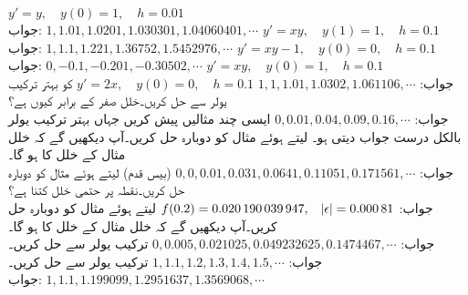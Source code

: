 \quad
$y'=y,\quad y(0)=1,\quad h=0.01$\\
جواب:\quad
$1,1.01,1.0201,1.030301,1.04060401,\cdots$
\quad
$y'=xy,\quad y(1)=1,\quad h=0.1$\\
جواب:\quad
$1,1.1,1.221,1.36752,1.5452976,\cdots$
\quad
$y'=xy-1,\quad y(0)=0,\quad h=0.1$\\
جواب:\quad
$0,-0.1,-0.201,-0.30502,\cdots$
\quad
$y'=xy,\quad y(0)=1,\quad h=0.1$\\
جواب:\quad
$1,1,1.01,1.0302,1.061106,\cdots$
\quad
$y'=2x,\quad y(0)=0,\quad h=0.1$
کو بہتر ترکیب یولر سے حل کریں۔خلل صفر کے برابر کیوں ہے؟\\
جواب:\quad
$0,0.01,0.04,0.09,0.16,\cdots$
\quad
ایسی چند مثالیں پیش کریں جہاں بہتر ترکیب یولر بالکل درست جواب دیتی ہو۔
\quad
{} لیتے ہوئے مثال  کو دوبارہ حل کریں۔آپ دیکھیں گے کہ خلل مثال  کے خلل کا  ہو گا۔\\
جواب:\quad
$0,0,0.01,0.031,0.0641,0.11051,0.171561,\cdots$
\quad
{} (بیس قدم) لیتے ہوئے مثال  کو دوبارہ حل کریں۔نقطہ  پر حتمی خلل کتنا ہے؟\\
جواب:\quad
$f(0.2)=\num{0.020190039947}, \quad \abs{\epsilon}=\num{0.00081}$
\quad
{} لیتے ہوئے مثال  کو دوبارہ حل کریں۔آپ دیکھیں گے کہ خلل  مثال  کے خلل کا  ہو گا۔\\
جواب:\quad
$0,\num{0.005},\num{0.021025},\num{0.049232625},\num{0.1474467},\cdots$
\quad
ترکیب یولر سے  حل کریں۔\\
جواب:\quad
$1,1.1,1.2,1.3,1.4,1.5,\cdots$
\quad
ترکیب یولر سے  حل کریں۔\\
جواب:\quad
$1,1.1,1.199099,1.2951637,1.3569068,\cdots$
